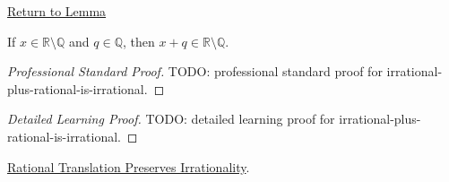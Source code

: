 \newpage
{}
\label{prf:irrational-plus-rational-is-irrational}

\begin{remark*}[Return]
\hyperref[lem:irrational-plus-rational-is-irrational]{Return to Lemma}
\end{remark*}

\begin{lemma*}
If $x\in\mathbb{R}\setminus\mathbb{Q}$ and $q\in\mathbb{Q}$, then
$x+q\in\mathbb{R}\setminus\mathbb{Q}$.
\end{lemma*}

\begin{proof}[Professional Standard Proof]
\LRAProofBodyStart
TODO: professional standard proof for irrational-plus-rational-is-irrational.
\end{proof}

\begin{proof}[Detailed Learning Proof]
\LRAProofBodyStart
TODO: detailed learning proof for irrational-plus-rational-is-irrational.
\end{proof}

\begin{remark*}
\end{remark*}

\begin{dependencies}
\hyperref[lem:rational-translation-preserves-irrationality]{Rational Translation Preserves Irrationality}.
\end{dependencies}

\clearpage
